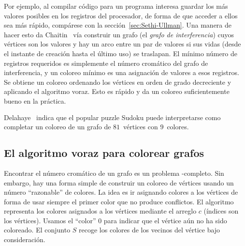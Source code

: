   Por ejemplo,
  al compilar código para un programa%
  interesa guardar los más valores posibles
  en los registros del procesador,
  de forma de que acceder a ellos sea más rápido,
  compárese con la sección~\ref{sec:Sethi-Ullman}.
  Una manera de hacer esto da Chaitin~%
    \cite{chaitin82:_regis_alloc_spill_via_graph_color}
  vía construir un grafo
  (el \emph{grafo de interferencia})
  cuyos vértices son los valores
  y hay un arco entre un par de valores si sus vidas
  (desde el instante de creación hasta el último uso)
  se traslapan.
  El mínimo número de registros requeridos
  es simplemente el número cromático
  del grafo de interferencia,
  y un coloreo mínimo
  es una asignación de valores a esos registros.
  Se obtiene un coloreo ordenando
  los vértices en orden de grado decreciente
  y aplicando el algoritmo voraz.
  Esto es rápido
  y da un coloreo suficientemente bueno en la práctica.

  Delahaye~%
    \cite{delahaye06:_sci_behind_sudoku}
  indica que el popular puzzle Sudoku puede interpretarse
  como completar un coloreo
  de un grafo de \(81\)~vértices con \(9\)~colores.%

\subsection{El algoritmo voraz para colorear grafos}
\label{sec:coloreo-voraz}

  Encontrar el número cromático de un grafo
  es un problema \NP\nobreakdash-completo.%
  Sin embargo,
  hay una forma simple de construir un coloreo de vértices
  usando un número ``razonable'' de colores.
  La idea es ir asignando colores a los vértices
  de forma de usar siempre el primer color
  que no produce conflictos.%
  El algoritmo representa los colores asignados a los vértices
  mediante el arreglo \(c\)
  (índices son los vértices).
  Usamos el ``color'' \(0\)
  para indicar que el vértice aún no ha sido coloreado.
  El conjunto \(S\) recoge los colores de los vecinos del vértice
  bajo consideración.


